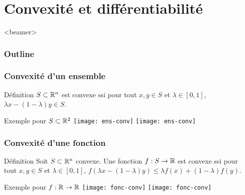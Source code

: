 \documentclass{beamer}
\newcommand{\R}{{\ensuremath\mathbb{R}}}
\begin{document}
\section{Convexité et différentiabilité}

\begin{frame}<beamer>
  \frametitle{Outline}
  \tableofcontents[currentsection]
\end{frame}


\begin{frame}
  \frametitle{Convexité d'un ensemble}

  \begin{block}{Définition}
    $S \subset \R^n$ est convexe ssi  
    pour tout $x,y \in S$ et $\lambda \in [0,1]$,
    $\lambda x - (1 - \lambda) y \in S$. 
  \end{block}

  \begin{exampleblock}{Exemple pour $S \subset \R^2$}
    \centering
    \texttt{[image: ens-conv]} \hspace{0.05\textwidth}
    \texttt{[image: ens-conv]}
  \end{exampleblock}
  
\end{frame}

\begin{frame}
  \frametitle{Convexité d'une fonction}

  \begin{block}{Définition}
     Soit $S \subset \R^n$ convexe.
     Une fonction $f : S \rightarrow \R$ est convexe ssi  
    pour tout $x,y \in S$ et $\lambda \in [0,1]$,
    $f(\lambda x - (1 - \lambda) y) \leq \lambda f(x) + (1 - \lambda) f(y)$. 
  \end{block}

  \begin{exampleblock}{Exemple pour $f:\R \rightarrow \R$}
    \centering
    \texttt{[image: fonc-conv]} \hspace{0.05\textwidth}
    \texttt{[image: fonc-conv]}
  \end{exampleblock}
  
\end{frame}
\end{document}
